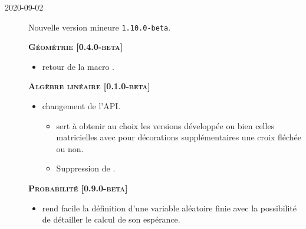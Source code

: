 \documentclass[12pt,a4paper]{book}
\begin{document}
        \begin{description}
\medskip
\item[2020-09-02] Nouvelle version mineure \verb+1.10.0-beta+.




\begin{center}
    \textbf{\textsc{Géométrie [0.4.0-beta]}}
\end{center}

\begin{itemize}[itemsep=.5em]
    \item {}
          retour de la macro .


\end{itemize}


\separation




\begin{center}
    \textbf{\textsc{Algèbre linéaire [0.1.0-beta]}}
\end{center}

\begin{itemize}[itemsep=.5em]
    \item {} changement de l'API.
    \begin{itemize}[itemsep=.5em]
        \item {} sert à obtenir au choix les versions développée ou bien celles matricielles avec pour décorations supplémentaires une croix fléchée ou non.

        \item Suppression de .
    \end{itemize}


\end{itemize}


\separation




\begin{center}
    \textbf{\textsc{Probabilité [0.9.0-beta]}}
\end{center}

\begin{itemize}[itemsep=.5em]
    \item {}
    	   rend facile la définition d'une variable aléatoire finie avec la possibilité de détailler le calcul de son espérance.



\end{itemize}
\end{description}
\end{document}

